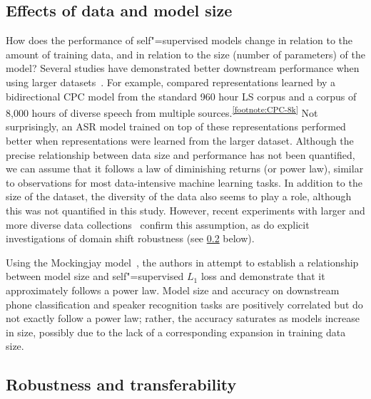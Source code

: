 \subsection{Effects of data and model size}
\label{subsec:modelsize}

How does the performance of self"=supervised models change in relation to the
amount of training data, and in relation to the size (number of parameters) of
the model?
Several studies have demonstrated better downstream performance when using
larger datasets~\parencite{riviere_unsupervised_2020, kawakami_learning_2020, chen_wavlm_2021}. For
example,
\parencite{kawakami_learning_2020} compared representations learned by a bidirectional
CPC model from the standard 960 hour LS corpus and a corpus of 8,000 hours of
diverse speech from multiple sources.\textsuperscript{\ref{footnote:CPC-8k}}
Not surprisingly, an ASR model trained on top of these representations
performed better when representations were learned from the larger dataset. 
Although the precise relationship between data size and performance has not
been quantified, we can assume that it follows a law of diminishing returns (or
power law), 
similar to observations for most data-intensive machine learning tasks.
In addition to the size of the dataset, the diversity of the data also seems
to play a role, although this was not quantified in this study. However, recent
experiments with larger and more diverse data collections~\parencite{chen_wavlm_2021}
confirm this assumption, as do 
explicit investigations of domain shift robustness (see
\cref{subsec:robustness} below). 

Using the Mockingjay 
model~\parencite{liu_mockingjay_2020}, the authors in \parencite{pu_scaling_2021} attempt to establish a relationship between
model size and self"=supervised \ensuremath{L_1} loss and demonstrate that it approximately
follows a power law. Model size and accuracy on downstream phone
classification and speaker recognition tasks are positively correlated but do not
exactly follow a power law; rather, the accuracy saturates as models increase in
size, possibly due to the lack of a corresponding expansion in training data
size.

\subsection{Robustness and transferability}
\label{subsec:robustness}

